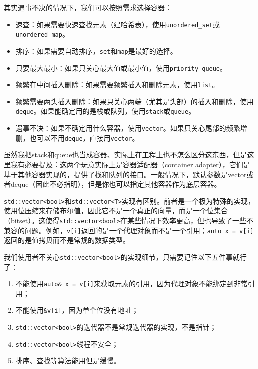 \documentclass[../main.tex]{subfiles}
\begin{document}
其实遇事不决的情况下，我们可以按照需求选择容器：
\begin{itemize}
  \item 速查：如果需要快速查找元素（建哈希表），使用\texttt{unordered\_set}或\texttt{unordered\_map}。
  \item 排序：如果需要自动排序，\texttt{set}和\texttt{map}是最好的选择。
  \item 只要最大最小：如果只关心最大值或最小值，使用\texttt{priority\_queue}。
  \item 频繁在中间插入删除：如果需要频繁插入和删除元素，使用\texttt{list}。
  \item 频繁需要两头插入删除：如果只关心两端（尤其是头部）的插入和删除，使用\texttt{deque}。如果能确定用的是栈或队列，使用\texttt{stack}或\texttt{queue}。
  \item 遇事不决：如果不确定用什么容器，使用\texttt{vector}。如果只关心尾部的频繁增删，也可以不用\texttt{deque}，直接用\texttt{vector}。
\end{itemize}

\begin{note}
  虽然我把stack和queue也当成容器、实际上在工程上也不怎么区分这东西，但是这里我有必要提及：这两个玩意实际上是容器适配器（container adapter），它们是基于其他容器实现的，提供了栈和队列的接口。一般情况下，默认参数是vector或者deque（因此不必指明），但是你也可以指定其他容器作为底层容器。
\end{note}

\begin{note}
  \texttt{std::vector<bool>}和\texttt{std::vector<T>}实现有区别。前者是一个极为特殊的实现，使用位压缩来存储布尔值，因此它不是一个真正的向量，而是一个位集合（bitset）。这使得\texttt{std::vector<bool>}在某些情况下效率更高，但也导致了一些不兼容的问题。例如，\texttt{v[i]}返回的是一个代理对象而不是一个引用；\texttt{auto x = v[i]}返回的是值拷贝而不是常规的数据类型。

  我们使用者不关心\texttt{std::vector<bool>}的实现细节，只需要记住以下五件事就行了：
  \begin{enumerate}
    \item 不能使用\texttt{auto\& x = v[i]}来获取元素的引用，因为代理对象不能绑定到非常引用；
    \item 不能使用\texttt{\&v[i]}，因为单个位没有地址；
    \item \texttt{std::vector<bool>}的迭代器不是常规迭代器的实现，不是指针；
    \item \texttt{std::vector<bool>}线程不安全；
    \item 排序、查找等算法能用但是缓慢。
  \end{enumerate}
\end{note}
\end{document}

